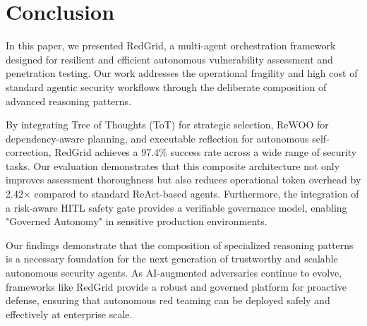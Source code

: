 \section{Conclusion}

In this paper, we presented RedGrid, a multi-agent orchestration framework designed for resilient and efficient autonomous vulnerability assessment and penetration testing. Our work addresses the operational fragility and high cost of standard agentic security workflows through the deliberate composition of advanced reasoning patterns. 

By integrating Tree of Thoughts (ToT) for strategic selection, ReWOO for dependency-aware planning, and executable reflection for autonomous self-correction, RedGrid achieves a 97.4\% success rate across a wide range of security tasks. Our evaluation demonstrates that this composite architecture not only improves assessment thoroughness but also reduces operational token overhead by 2.42$\times$ compared to standard ReAct-based agents. Furthermore, the integration of a risk-aware HITL safety gate provides a verifiable governance model, enabling "Governed Autonomy" in sensitive production environments.

Our findings demonstrate that the composition of specialized reasoning patterns is a necessary foundation for the next generation of trustworthy and scalable autonomous security agents. As AI-augmented adversaries continue to evolve, frameworks like RedGrid provide a robust and governed platform for proactive defense, ensuring that autonomous red teaming can be deployed safely and effectively at enterprise scale.
